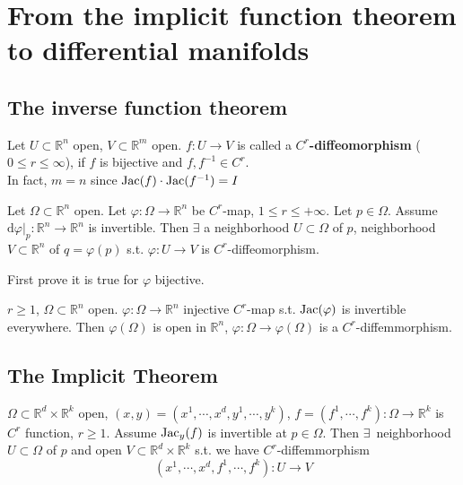 \section{From the implicit function theorem to differential manifolds}
\subsection{The inverse function theorem}
\begin{definition}
    Let  $ U\subset \mathbb{R}^n $ open,  $ V\subset \mathbb{R}^m $ open.  $ f: U\rightarrow V  $ is called a  \textbf{$ C^r $-diffeomorphism} ($ 0 \leq r \leq \infty $), if  $ f  $ is bijective and  $ f,f^{-1}\in C^r $. \\
    In fact,  $ m=n $ since  $ \operatorname{Jac}(f)\cdot\operatorname{Jac}(f^{-1})=I $ 
\end{definition}
\begin{theorem}
    Let  $ \Omega\subset \mathbb{R}^n $ open. Let  $ \varphi:\Omega\rightarrow\mathbb{R}^n $ be  $ C^r $-map,  $ 1 \leq r \leq +\infty $.  Let  $ p\in \Omega $. Assume  $ \mathrm{d}\varphi|_p:\mathbb{R}^n\rightarrow \mathbb{R}^n $ is invertible. Then  $ \exists  $ a neighborhood  $ U\subset  \Omega $  of  $ p $, neighborhood  $ V\subset \mathbb{R}^n $ of  $ q=\varphi(p) $ s.t.  $ \varphi:U\rightarrow V $ is  $ C^r $-diffeomorphism.  
\end{theorem} 
\begin{lemma}
    First prove it is true for  $ \varphi  $ bijective.
\end{lemma}
\begin{corollary}
     $ r \geq 1  $,  $ \Omega\subset \mathbb{R}^n $ open.  $ \varphi:\Omega\rightarrow \mathbb{R}^n $ injective  $ C^r $-map s.t.  $ \operatorname{Jac}(\varphi) $  is invertible everywhere. Then  $ \varphi(\Omega) $ is open in  $ \mathbb{R}^n $,  $ \varphi:\Omega\rightarrow \varphi(\Omega) $ is a  $ C^r $-diffemmorphism.     
\end{corollary}
\subsection{The Implicit Theorem}
\begin{corollary}
     $ \Omega\subset \mathbb{R}^d\times\mathbb{R}^k $ open,  $ (x,y)=(x^1,\cdots,x^d,y^1,\cdots,y^k) $,  $ f=(f^1,\cdots,f^k):\Omega\rightarrow \mathbb{R}^k $ is  $ C^r $ function, $ r \geq 1 $. Assume  $ \operatorname{Jac}_y(f) $ is invertible at  $ p\in \Omega $. Then  $ \exists\, $ neighborhood  $ U\subset \Omega  $ of $ p $ and open  $ V\subset \mathbb{R}^d\times\mathbb{R}^k $ s.t. we have  $ C^r $-diffemmorphism 
     \[(x^1,\cdots,x^d,f^1,\cdots,f^k):U\rightarrow V\]    
\end{corollary}

